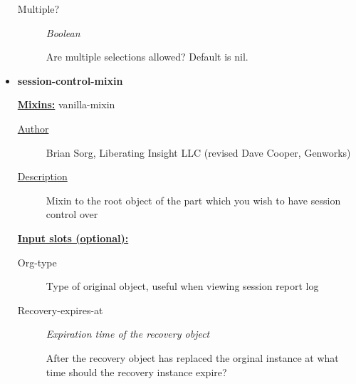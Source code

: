 \documentclass [11pt]{book}
\begin{document}
\begin{itemize}
\begin{description}

\item [Multiple?]
\emph{Boolean}

 Are multiple selections allowed? Default is nil.




\end{description}







\item {}
\label{prim:session-control-mixin}
\textbf{session-control-mixin}


\textbf{
\underline{Mixins:}} vanilla-mixin





\begin{description}

\item [
\underline{Author}]


Brian Sorg, Liberating Insight LLC (revised Dave Cooper, Genworks)



\item [
\underline{Description}]


Mixin to the root object of the part which you wish to have session control over



\end{description}








\textbf{
\underline{Input slots (optional):}}

\begin{description}

\item [Org-type]

Type of original object, useful when viewing session report log




\item [Recovery-expires-at]
\emph{Expiration time of the recovery object}

 After the recovery object has replaced the orginal
instance at what time should the recovery instance expire?





\end{description}
\end{itemize}
\end{document}
